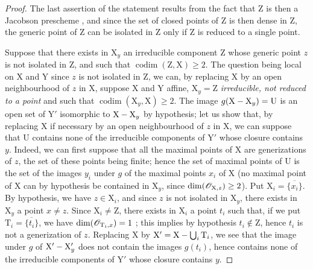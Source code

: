 \begin{proof}
The last assertion of the statement results from the fact that $\mathrm{Z}$ is then a Jacobson prescheme , and since the set of closed points of $\mathrm{Z}$ is then dense in $\mathrm{Z}$, the generic point of $\mathrm{Z}$ can be isolated in $\mathrm{Z}$ only if $\mathrm{Z}$ is reduced to a single point.

Suppose that there exists in $\mathrm{X}_y$ an irreducible component $\mathrm{Z}$ whose generic point $z$ is not isolated in $\mathrm{Z}$, and such that $\operatorname{codim}(\mathrm{Z},\mathrm{X})\geq 2$.
The question being local
on $\mathrm{X}$ and $\mathrm{Y}$ since $z$ is not isolated in $\mathrm{Z}$, we can, by replacing $\mathrm{X}$ by an open neighbourhood of $z$ in $\mathrm{X}$, suppose $\mathrm{X}$ and $\mathrm{Y}$ affine, $\mathrm{X}_y=\mathrm{Z}$ \emph{irreducible, not reduced to a point} and such that $\operatorname{codim}(\mathrm{X}_y,\mathrm{X})\geq 2$. The image $g(\mathrm{X}-\mathrm{X}_y)=\mathrm{U}$ is an open set of $\mathrm{Y}'$ isomorphic to $\mathrm{X}-\mathrm{X}_y$ by hypothesis; let us show that, by replacing $\mathrm{X}$ if necessary by an open neighbourhood of $z$ in $\mathrm{X}$, we can suppose that $\mathrm{U}$ contains none of the irreducible components of $\mathrm{Y}'$ whose closure contains $y$.
Indeed, we can first suppose that all the maximal points of $\mathrm{X}$ are generizations of $z$, the set of these points being finite; hence the set of maximal points of $\mathrm{U}$ is the set of the images $y_i$ under $g$ of the maximal points $x_i$ of $\mathrm{X}$ (no maximal point of $\mathrm{X}$ can by hypothesis be contained in $\mathrm{X}_y$, since $\dim(\mathscr{O}_{\mathrm{X},z})\geq 2$). Put $\mathrm{X}_i=\overline{\{x_i\}}$. By hypothesis, we have $z\in\mathrm{X}_i$, and since $z$ is not isolated in $\mathrm{X}_y$, there exists in $\mathrm{X}_y$ a point $x\neq z$. Since $\mathrm{X}_i\neq\mathrm{Z}$, there exists in $\mathrm{X}_i$ a point $t_i$ such that, if we put $\mathrm{T}_i=\overline{\{t_i\}}$, we have $\dim(\mathscr{O}_{\mathrm{T}_i,x})=1$ ; this implies by hypothesis $t_i\notin\mathrm{Z}$, hence $t_i$ is not a generization of $z$. Replacing $\mathrm{X}$ by $\mathrm{X}'=\mathrm{X}-\bigcup_i\mathrm{T}_i$, we see that the image under $g$ of $\mathrm{X}'-\mathrm{X}'_y$ does not contain the images $g(t_i)$, hence contains none of the irreducible components of $\mathrm{Y}'$ whose closure contains $y$.

\end{proof}
